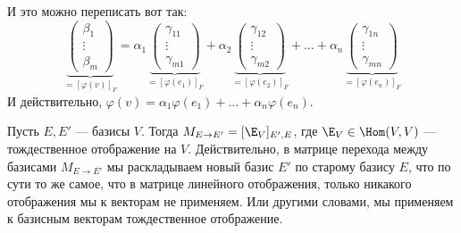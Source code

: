 И это можно переписать вот так:
$$
\underbrace{
\begin{pmatrix}
    \beta_1 \\
    \vdots \\ 
    \beta_m
\end{pmatrix}
}_{=[\varphi(v)]_F}
=
\alpha_1
\underbrace{
\begin{pmatrix}
    \gamma_{11} \\ 
    \vdots \\ 
    \gamma_{m1}
\end{pmatrix}
}_{=[\varphi(e_1)]_F}
+
\alpha_2
\underbrace{
\begin{pmatrix}
    \gamma_{12} \\ 
    \vdots \\ 
    \gamma_{m2}
\end{pmatrix}
}_{=[\varphi(e_2)]_F}
+
\dots
+
\alpha_n
\underbrace{
\begin{pmatrix}
    \gamma_{1n} \\ 
    \vdots \\ 
    \gamma_{mn}
\end{pmatrix}
}_{=[\varphi(e_n)]_F}
$$
И действительно, 
$\varphi(v) = \alpha_1 \varphi(e_1) + \dots + \alpha_n \varphi(e_n)$.

\notice Пусть $E, E'$ --- базисы $V$. Тогда $M_{E \to E'} =
[\E_V]_{E', E}$, где $\E_V \in \Hom(V, V)$ --- тождественное отображение на $V$.
Действительно, в матрице перехода между базисами 
$M_{E \to E'}$ мы раскладываем новый базис $E'$ по старому базису $E$,
что по сути то же самое, что в матрице линейного отображения, только
никакого отображения мы к векторам не применяем. Или другими словами,
мы применяем к базисным векторам тождественное отображение.
